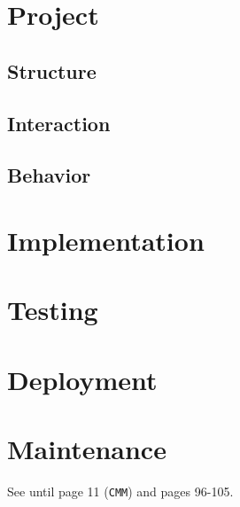 \documentclass{llncs}
\newcommand{\labelsec}[1]{\label{sec:#1}}
\begin{document}
\section{Project}
\labelsec{Project}

\subsection{Structure}
\subsection{Interaction}
\subsection{Behavior}

\section{Implementation}
\labelsec{Implementation}

\section{Testing}
\labelsec{testing}

\section{Deployment}
\labelsec{Deployment}

\section{Maintenance}
\labelsec{Maintenance}
\newpage
See \cite{natMol09} until page 11 (\texttt{CMM}) and pages 96-105.
\end{document}
